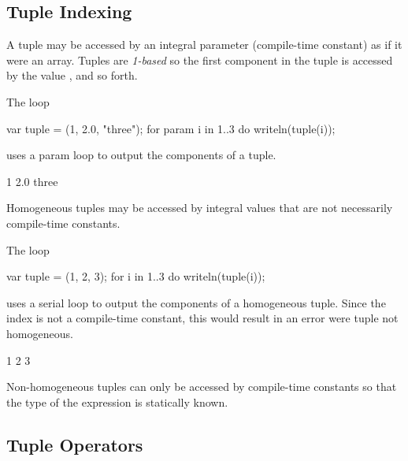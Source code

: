 \subsection{Tuple Indexing}
\label{Tuple_Indexing}

A tuple may be accessed by an integral parameter (compile-time
constant) as if it were an array.  Tuples are \emph{1-based} so the
first component in the tuple is accessed by the value , and so
forth.

\begin{example}
\begin{chapelpre}
\end{chapelpre}
The loop
\begin{chapel}
var tuple = (1, 2.0, "three");
for param i in 1..3 do
  writeln(tuple(i));
\end{chapel}
uses a param loop to output the components of a tuple.
\begin{chapelpost}
\end{chapelpost}
\begin{chapeloutput}
1
2.0
three
\end{chapeloutput}
\end{example}

Homogeneous tuples may be accessed by integral values that are not
necessarily compile-time constants.

\begin{example}
\begin{chapelpre}
\end{chapelpre}
The loop
\begin{chapel}
var tuple = (1, 2, 3);
for i in 1..3 do
  writeln(tuple(i));
\end{chapel}
uses a serial loop to output the components of a homogeneous tuple.
Since the index is not a compile-time constant, this would result in
an error were tuple not homogeneous.
\begin{chapelpost}
\end{chapelpost}
\begin{chapeloutput}
1
2
3
\end{chapeloutput}
\end{example}

\begin{rationale}
Non-homogeneous tuples can only be accessed by compile-time constants
so that the type of the expression is statically known.
\end{rationale}

\subsection{Tuple Operators}
\label{Tuple_Operators}

